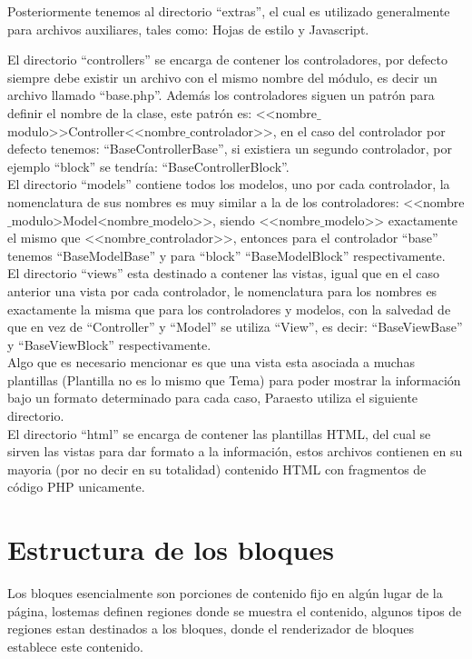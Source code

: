 Posteriormente tenemos al directorio ``extras'', el cual es utilizado generalmente para archivos auxiliares, tales como: Hojas de estilo y Javascript.

El directorio ``controllers'' se encarga de contener los controladores, por defecto siempre debe existir un archivo con el mismo nombre del m\'odulo, es decir un archivo llamado ``base.php''. Adem\'as los controladores siguen un patr\'on para definir el nombre de la clase, este patr\'on es: <<nombre$\_$modulo>>Controller<<nombre$\_$controlador>>, en el caso del controlador por defecto tenemos: ``BaseControllerBase'', si existiera un segundo controlador, por ejemplo ``block'' se tendr\'ia: ``BaseControllerBlock''.\\

El directorio ``models'' contiene todos los modelos, uno por cada controlador, la nomenclatura de sus nombres es muy similar a la de los controladores: <<nombre$\_$modulo>Model<nombre$\_$modelo>>, siendo <<nombre$\_$modelo>> exactamente el mismo que <<nombre$\_$controlador>>, entonces para el controlador ``base'' tenemos ``BaseModelBase'' y para ``block'' ``BaseModelBlock'' respectivamente.\\

El directorio ``views'' esta destinado a contener las vistas, igual que en el caso anterior una vista por cada controlador, le nomenclatura para los nombres es exactamente la misma que para los controladores y modelos, con la salvedad de que en vez de ``Controller'' y ``Model'' se utiliza ``View'', es decir: ``BaseViewBase'' y ``BaseViewBlock'' respectivamente.\\

Algo que es necesario mencionar es que una vista esta asociada a muchas plantillas (Plantilla no es lo mismo que Tema) para poder mostrar la informaci\'on bajo un formato determinado para cada caso, Paraesto utiliza el siguiente directorio.\\

El directorio ``html'' se encarga de contener las plantillas HTML, del cual se sirven las vistas para dar formato a la informaci\'on, estos archivos contienen en su mayoria (por no decir en su totalidad) contenido HTML con fragmentos de c\'odigo PHP unicamente.\\

\section{Estructura de los bloques}
Los bloques esencialmente son porciones de contenido fijo en alg\'un lugar de la p\'agina, lostemas definen regiones donde se muestra el contenido, algunos tipos de regiones estan destinados a los bloques, donde el renderizador de bloques establece este contenido.\\

